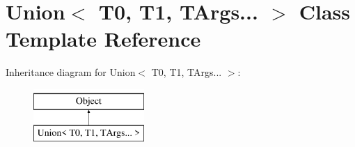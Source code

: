 \hypertarget{classUnion_3_01T0_00_01T1_00_01TArgs_8_8_8_01_4}{}\section{Union$<$ T0, T1, T\+Args... $>$ Class Template Reference}
\label{classUnion_3_01T0_00_01T1_00_01TArgs_8_8_8_01_4}
Inheritance diagram for Union$<$ T0, T1, T\+Args... $>$\+:\begin{figure}[H]
\begin{center}
\leavevmode
\includegraphics[height=2.000000cm]{classUnion_3_01T0_00_01T1_00_01TArgs_8_8_8_01_4}
\end{center}
\end{figure}
